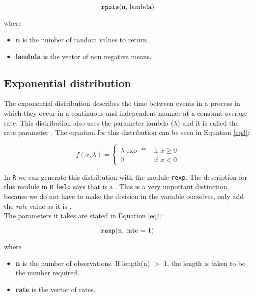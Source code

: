 \documentclass{article}
\newenvironment{where}{\noindent{}where\begin{itemize}}{\end{itemize}}
\begin{document}
\begin{equation} \label{eq2}
\mbox{\texttt{rpois}(n, lambda)}
\end{equation}

\begin{where}
\item \textbf{n} is the number of random values to return.
\item \textbf{lambda} is the vector of non negative means.
\end{where}

\smallskip

\subsection{Exponential distribution}

The exponential distribution describes the time between events in a process in which they occur in a continuous and independent manner at a constant average rate. This distribution also uses the parameter lambda ($\lambda$) and it is called the rate parameter \cite{distributions}. The equation for this distribution can be seen in Equation \ref{eq3}:

\begin{equation} \label{eq3}
f(x;\lambda) = 
  \begin{cases} 
   \lambda \exp^{-\lambda x} & \text{if } x \geq 0 \\
   0       & \text{if } x < 0
  \end{cases}
\end{equation}

\smallskip

In \texttt{R} we can generate this distribution with the module \texttt{rexp}. The description for this module in \texttt{R help} says that is a  \cite{rexp}. This is a very important distinction, because we do not have to make the division in the variable ourselves, only add the \textit{rate} value as it is \cite{distributions}.\\ 

The parameters it takes are stated in Equation \ref{eq4}:

\begin{equation} \label{eq4}
\mbox{\texttt{rexp}(n, rate = 1)}
\end{equation}

\begin{where}
\item \textbf{n} is the number of observations. If length(n) $>$ 1, the length is taken to be the number required.
\item \textbf{rate} is the vector of rates.
\end{where}
\end{document}
